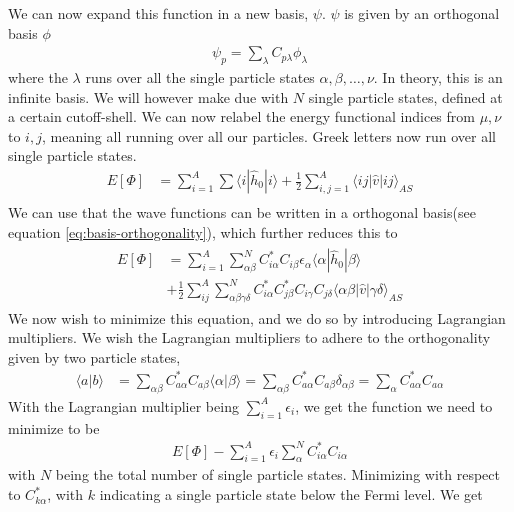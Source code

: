 \documentclass[11pt]{article}
\begin{document}
We can now expand this function in a new basis, $\psi$. $\psi$ is given by an orthogonal basis $\phi$
\begin{align}
	\psi_p = \sum_\lambda C_{p\lambda} \phi_\lambda
	\label{eq:basis-orthogonality}
\end{align}
where the $\lambda$ runs over all the single particle states $\alpha, \beta, \dots, \nu$. In theory, this is an infinite basis. We will however make due with $N$ single particle states, defined at a certain cutoff-shell. We can now relabel the energy functional indices from $\mu,\nu$ to $i,j$, meaning all running over all our particles. Greek letters now run over all single particle states.
\begin{align*}
	E[\Phi] &= \sum^A_{i=1} \sum \langle i |\hat{h}_0| i \rangle + \frac{1}{2}\sum^A_{i,j=1} \langle ij |\hat{v}| ij \rangle_{AS} \\
\end{align*}
We can use that the wave functions can be written in a orthogonal basis(see equation \eqref{eq:basis-orthogonality}), which further reduces this to
\begin{align}
	\begin{split}
		E[\Phi] &= \sum^A_{i=1} \sum^N_{\alpha\beta} C^*_{i\alpha} C_{i\beta} \epsilon_\alpha \langle\alpha|\hat{h}_0|\beta\rangle \\&+ \frac{1}{2}\sum^A_{ij}\sum^N_{\alpha\beta\gamma\delta} C^*_{i\alpha}C^*_{j\beta}C_{i\gamma}C_{j\delta} \langle \alpha\beta|\hat{v}|\gamma\delta\rangle_{AS}
		\label{eq:energy-functional-basis}
	\end{split}
\end{align}
We now wish to minimize this equation, and we do so by introducing Lagrangian multipliers. We wish the Lagrangian multipliers to adhere to the orthogonality given by two particle states,
\begin{align*}
	\langle a | b \rangle &= \sum_{\alpha\beta}C_{a\alpha}^*C_{a\beta}\langle \alpha | \beta \rangle = \sum_{\alpha\beta}C_{a\alpha}^*C_{a\beta}\delta_{\alpha\beta} 
	= \sum_{\alpha}C_{a\alpha}^*C_{a\alpha}
\end{align*}
With the Lagrangian multiplier being $\sum_{i=1}^A \epsilon_i$, we get the function we need to minimize to be
\begin{align*}
	E[\Phi] - \sum_{i=1}^A \epsilon_i \sum_{\alpha}^N C_{i\alpha}^*C_{i\alpha}
\end{align*}
with $N$ being the total number of single particle states. Minimizing with respect to $C^*_{k\alpha}$, with $k$ indicating a single particle state below the Fermi level. We get
\end{document}
